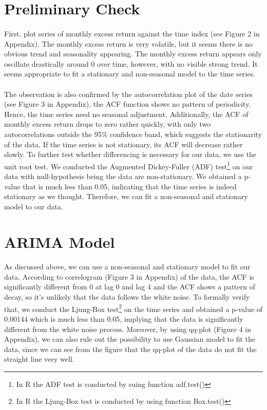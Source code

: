 \documentclass[10pt,letter]{article}
\begin{document}
\section*{Preliminary Check}
\paragraph{} First, plot series of monthly excess return against the time index (see Figure 2 in Appendix). The monthly excess return is very volatile, but it seems there is no obvious trend and seasonality appearing. The monthly excess return appears only oscillate drastically around 0 over time, however, with no visible strong trend. It seems appropriate to fit a stationary and non-seasonal model to the time series.
\paragraph{} The observation is also confirmed by the autocorrelation plot of the date series (see Figure 3 in Appendix), the ACF function shows no pattern of periodicity. Hence, the time series need no seasonal adjustment. Additionally, the ACF of monthly excess return drops to zero rather quickly, with only two autocorrelations outside the 95\% confidence band, which suggests the stationarity of the data. If the time series is not stationary, its ACF will decrease rather slowly. To further test whether differencing is necessary for our data, we use the unit root test. We conducted the Augmented Dickey-Fuller (ADF) test\footnote[4]{In R the ADF test is conducted by suing function adf.test()} on our data with null-hypothesis being the data are non-stationary. We obtained a p-value that is much less than 0.05, indicating that the time series is indeed stationary as we thought. Therefore, we can fit a non-seasonal and stationary model to our data.

\section*{ARIMA Model}
\paragraph{} As discussed above, we can use a non-seasonal and stationary model to fit our data. According to correlogram (Figure 3 in Appendix) of the data, the ACF is significantly different from 0 at lag 0 and lag 4 and the ACF shows a pattern of decay, so it's unlikely that the data follows the white noise. To formally verify that, we conduct the Ljung-Box test\footnote[5]{In R the Ljung-Box test is conducted by using function Box.test()} on the time series and obtained a p-value of 0.00144 which is much less than 0.05, implying that the data is significantly different from the white noise process. Moreover, by using qq-plot (Figure 4 in Appendix), we can also rule out the possibility to use Gaussian model to fit the data, since we can see from the figure that the qq-plot of the data do not fit the straight line very well. 
\end{document}
